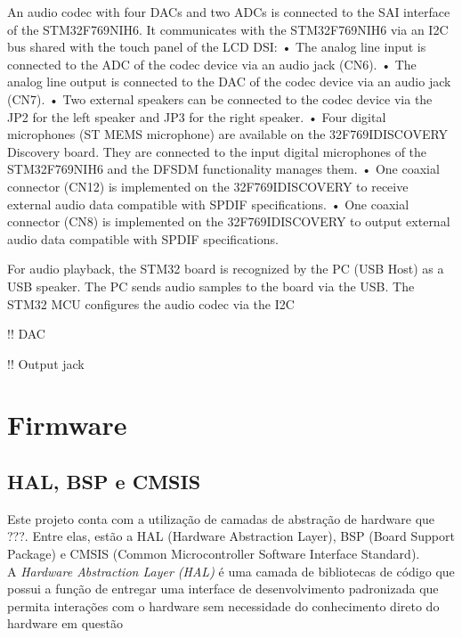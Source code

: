 \color{red}
An audio codec with four DACs and two ADCs is connected to the SAI interface of the
STM32F769NIH6. It communicates with the STM32F769NIH6 via an I2C bus shared with
the touch panel of the LCD DSI:
• The analog line input is connected to the ADC of the codec device via an audio jack
(CN6).
• The analog line output is connected to the DAC of the codec device via an audio jack
(CN7).
• Two external speakers can be connected to the codec device via the JP2 for the left
speaker and JP3 for the right speaker.
• Four digital microphones (ST MEMS microphone) are available on the
32F769IDISCOVERY Discovery board. They are connected to the input digital
microphones of the STM32F769NIH6 and the DFSDM functionality manages them.
• One coaxial connector (CN12) is implemented on the 32F769IDISCOVERY to receive
external audio data compatible with SPDIF specifications.
• One coaxial connector (CN8) is implemented on the 32F769IDISCOVERY to output
external audio data compatible with SPDIF specifications.

For audio playback, the STM32 board is recognized by the PC (USB Host) as a USB
speaker. The PC sends audio samples to the board via the USB. The STM32 MCU
configures the audio codec via the I2C
\color{black}

!! DAC

!! Output jack

\section{Firmware}
\subsection{HAL, BSP e CMSIS}
Este projeto conta com a utilização de camadas de abstração de hardware que ???. Entre elas, estão a HAL (Hardware Abstraction Layer), BSP (Board Support Package) e CMSIS (Common Microcontroller Software Interface Standard).
\\[10pt]


A \textit{Hardware Abstraction Layer (HAL)} é uma camada de bibliotecas de código que possui a função de entregar uma interface de desenvolvimento padronizada que permita interações com o hardware sem necessidade do conhecimento direto do hardware em questão 

